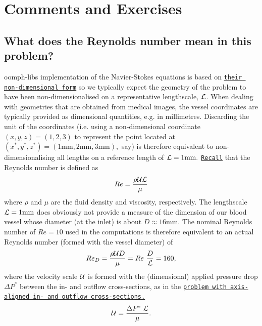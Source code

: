 \hypertarget{index_comm_ex}{}\section{Comments and Exercises}\label{index_comm_ex}
\hypertarget{index_re}{}\subsection{What does the Reynolds number mean in this problem?}\label{index_re}
{\ttfamily oomph-\/lib\textquotesingle{}s} implementation of the Navier-\/\+Stokes equations is based on \href{../../driven_cavity/html/index.html#equation}{\tt their non-\/dimensional form} so we typically expect the geometry of the problem to have been non-\/dimensionalised on a representative lengthscale, $ {\cal L} $. When dealing with geometries that are obtained from medical images, the vessel coordinates are typically provided as dimensional quantities, e.\+g. in millimetres. Discarding the unit of the coordinates (i.\+e. using a non-\/dimensional coordinate $ (x,y,z)=(1,2,3)$ to represent the point located at $ (x^*,y^*,z^*)=(1\mbox{mm},2\mbox{mm},3\mbox{mm}),$ say) is therefore equivalent to non-\/dimensionalising all lengths on a reference length of $ {\cal L} = 1\mbox{mm}. $ \href{../../driven_cavity/html/index.html#equation}{\tt Recall} that the Reynolds number is defined as \[ Re = \frac{\rho {\cal U} {\cal L}}{\mu} \] where $ \rho $ and $ \mu $ are the fluid density and viscosity, respectively. The lengthscale $ {\cal L} = 1\mbox{mm} $ does obviously not provide a measure of the dimension of our blood vessel whose diameter (at the inlet) is about $ D \approx 16\mbox{mm}. $ The nominal Reynolds number of $ Re=10 $ used in the computations is therefore equivalent to an actual Reynolds number (formed with the vessel diameter) of \[ Re_D = \frac{\rho {\cal U} D }{\mu} = Re \ \frac{D}{\cal L} = 160, \] where the velocity scale $ {\cal U} $ is formed with the (dimensional) applied pressure drop $ \Delta P^* $ between the in-\/ and outflow cross-\/sections, as in the \href{../../unstructured_three_d_fluid/html/index.html}{\tt problem with axis-\/aligned in-\/ and outflow cross-\/sections,} \[ {\cal U} = \frac{\Delta P^*\ {\cal L} }{\mu}. \] 

